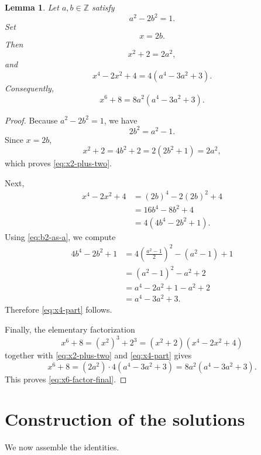 \documentclass[11pt]{article}
\numberwithin{equation}{section}
\newtheorem{lemma}[theorem]{Lemma}
\theoremstyle{remark}
\begin{document}
\begin{lemma}\label{lem:x6-plus-eight}
Let \(a,b\in\mathbb Z\) satisfy
\[
    a^2-2b^2=1.
\]
Set
\[
    x=2b.
\]
Then
\begin{equation}\label{eq:x2-plus-two}
    x^2+2=2a^2,
\end{equation}
and
\begin{equation}\label{eq:x4-part}
    x^4-2x^2+4=4(a^4-3a^2+3).
\end{equation}
Consequently,
\begin{equation}\label{eq:x6-factor-final}
    x^6+8=8a^2(a^4-3a^2+3).
\end{equation}
\end{lemma}

\begin{proof}
Because \(a^2-2b^2=1\), we have
\begin{equation}\label{eq:b2-as-a}
    2b^2=a^2-1.
\end{equation}
Since \(x=2b\),
\[
    x^2+2=4b^2+2=2(2b^2+1)=2a^2,
\]
which proves \eqref{eq:x2-plus-two}.

Next,
\begin{align*}
    x^4-2x^2+4
    &=(2b)^4-2(2b)^2+4\\
    &=16b^4-8b^2+4\\
    &=4(4b^4-2b^2+1).
\end{align*}
Using \eqref{eq:b2-as-a}, we compute
\begin{align*}
    4b^4-2b^2+1
    &=4\left(\frac{a^2-1}{2}\right)^2
      -(a^2-1)+1\\
    &=(a^2-1)^2-a^2+2\\
    &=a^4-2a^2+1-a^2+2\\
    &=a^4-3a^2+3.
\end{align*}
Therefore \eqref{eq:x4-part} follows.

Finally, the elementary factorization
\[
    x^6+8=(x^2)^3+2^3=(x^2+2)(x^4-2x^2+4)
\]
together with \eqref{eq:x2-plus-two} and \eqref{eq:x4-part} gives
\[
    x^6+8=(2a^2)\cdot 4(a^4-3a^2+3)
    =8a^2(a^4-3a^2+3).
\]
This proves \eqref{eq:x6-factor-final}.
\end{proof}

\section{Construction of the solutions}

We now assemble the identities.
\end{document}
